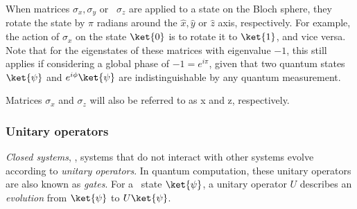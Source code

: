 When matrices $\sigma_x, \sigma_y$ or  $\sigma_z$ are applied to a state on the Bloch sphere, they rotate the state by $\pi$ radians around the $\hat{x}, \hat{y}$ or $\hat{z}$ axis, respectively. For example, the action of $\sigma_x$ on the state $\ket{0}$ is to rotate it to $\ket{1}$, and vice versa. Note that for the eigenstates of these matrices with eigenvalue $-1$, this still applies if considering a global phase of $-1 = e^{i\pi}$, given that two quantum states $\ket{\psi}$ and $e^{i\phi}\ket{\psi}$ are indistinguishable by any quantum measurement.

Matrices $\sigma_x$ and $\sigma_z$ will also be referred to as \gls{x} and \gls{z}, respectively.

\subsubsection{Unitary operators}
\begin{definition}
  \emph{Closed systems}, , systems that do not interact with other systems evolve according to \emph{unitary operators}. In quantum computation, these unitary operators are also known as \emph{gates}. For a  state $\ket{\psi}$, a unitary operator $U$ describes an \emph{evolution} from $\ket{\psi}$ to $ U\ket{\psi}$.
\end{definition}

